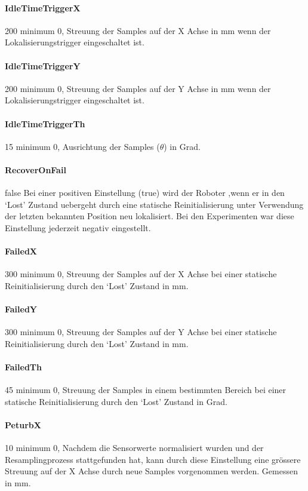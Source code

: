 \documentclass{article}
\begin{document}
\paragraph{IdleTimeTriggerX} 200      minimum 0,  Streuung der Samples auf der X Achse in mm wenn der Lokalisierungstrigger eingeschaltet ist.

\paragraph{IdleTimeTriggerY} 200      minimum 0,  Streuung der Samples auf der Y Achse in mm wenn der Lokalisierungstrigger eingeschaltet ist.

\paragraph{IdleTimeTriggerTh} 15      minimum 0,  Ausrichtung der Samples ($\theta$) in Grad.

\paragraph{RecoverOnFail} false       Bei einer positiven Einstellung (true) wird der Roboter ,wenn er in den `Lost' Zustand uebergeht durch eine statische Reinitialisierung unter Verwendung der letzten bekannten Position neu lokalisiert. Bei den Experimenten war diese Einstellung jederzeit negativ eingestellt.


\paragraph{FailedX} 300               minimum 0,  Streuung der Samples auf der X Achse bei einer statische Reinitialisierung durch den `Lost' Zustand in mm.

\paragraph{FailedY} 300               minimum 0,  Streuung der Samples auf der Y Achse bei einer statische Reinitialisierung durch den `Lost' Zustand in mm.

\paragraph{FailedTh} 45               minimum 0,   Streuung der Samples in einem bestimmten Bereich bei einer statische Reinitialisierung durch den `Lost' Zustand in Grad.

\paragraph{PeturbX}\label{PeturbX} 10                minimum 0, Nachdem die Sensorwerte normalisiert wurden und der Resamplingprozess stattgefunden hat, kann durch diese Einstellung eine gr\"ossere Streuung auf der X Achse durch neue Samples vorgenommen werden. Gemessen in mm.
\end{document}
